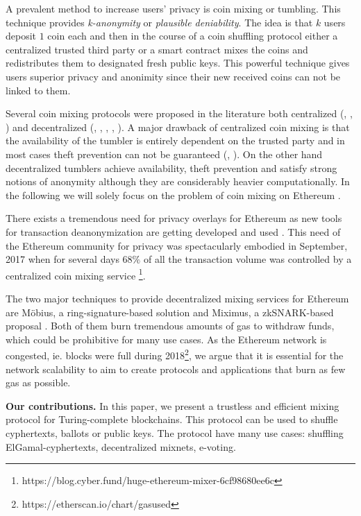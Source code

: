 \documentclass[conference, compsoc]{IEEEtran}
\theoremstyle{definition}
\begin{document}
A prevalent method to increase users' privacy is coin mixing or tumbling. This technique provides \textit{k-anonymity} or \textit{plausible deniability}. The idea is that $k$ users deposit $1$ coin each and then in the course of a coin shuffling protocol either a centralized trusted third party or a smart contract mixes the coins and redistributes them to designated fresh public keys. This powerful technique gives users superior privacy and anonimity since their new received coins can not be linked to them.

Several coin mixing protocols were proposed in the literature both centralized (\cite{bonneau2014mixcoin}, \cite{valenta2015blindcoin}, \cite{heilman2017tumblebit}) and decentralized (\cite{maxwell2013coinjoin}, \cite{ruffing2014coinshuffle}, \cite{miximus2018}, \cite{meiklejohn2018mobius}, \cite{bissias2014sybil}). A major drawback of centralized coin mixing is that the availability of the tumbler is entirely dependent on the trusted party and in most cases theft prevention can not be guaranteed (\cite{bonneau2014mixcoin}, \cite{valenta2015blindcoin}). On the other hand decentralized tumblers achieve availability, theft prevention and satisfy strong notions of anonymity although they are considerably heavier computationally. In the following we will solely focus on the problem of coin mixing on Ethereum \cite{wood2014ethereum}. 

There exists a tremendous need for privacy overlays for Ethereum as new tools for transaction deanonymization are getting developed and used \cite{chan2017ethereum}. This need of the Ethereum community for privacy was spectacularly embodied in September, 2017 when for several days $68\%$ of all the transaction volume was controlled by a centralized coin mixing service \footnote{https://blog.cyber.fund/huge-ethereum-mixer-6cf98680ee6c}.

The two major techniques to provide decentralized mixing services for Ethereum are Möbius, a ring-signature-based solution \cite{meiklejohn2018mobius} and Miximus, a zkSNARK-based proposal \cite{miximus2018}. Both of them burn tremendous amounts of gas to withdraw funds, which could be prohibitive for many use cases. As the Ethereum network is congested, ie. blocks were full during 2018\footnote{https://etherscan.io/chart/gasused}, we argue that it is essential for the network scalability to aim to create protocols and applications that burn as few gas as possible. 

\textbf{Our contributions.} In this paper, we present a trustless and efficient mixing protocol for Turing-complete blockchains. This protocol can be used to shuffle cyphertexts, ballots or public keys. The protocol have many use cases: shuffling ElGamal-cyphertexts, decentralized mixnets, e-voting.
\end{document}
